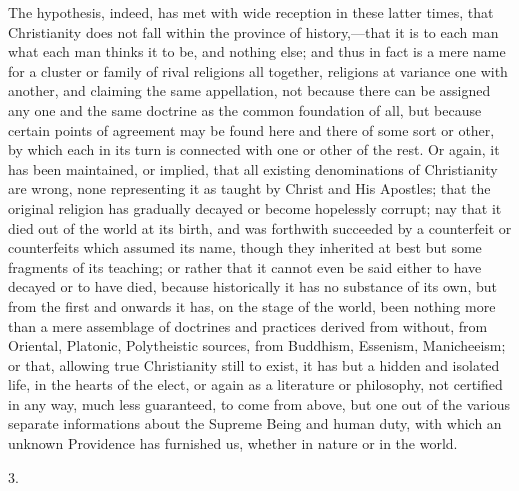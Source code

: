 The hypothesis, indeed, has met with wide reception in
these latter times, that Christianity does not fall
within the province of history,—that it is to each
man what each man thinks it to be, and nothing else; and
thus in fact is a mere name for a cluster or family of
rival religions all together, religions at variance one
with another, and claiming the same appellation, not
because there can be assigned any one and the same
doctrine as the common foundation of all, but because
certain points of agreement may be found here and there
of some sort or other, by which each in its turn is
connected with one or other of the rest. Or again, it has
been maintained, or implied, that all existing
denominations of Christianity are wrong, none
representing it as taught by Christ and His Apostles;
that the original religion has gradually decayed or
become hopelessly corrupt; nay that it died out of the
world at its birth, and was forthwith succeeded by a
counterfeit or counterfeits which assumed its name,
though they inherited at best but some fragments of its
teaching; or rather that it cannot even be said either to
have decayed or to have died, because historically it has
no substance of its own, but from the first and onwards
it has, on the stage of the world, been nothing more than
a mere assemblage of doctrines and practices derived from
without, from Oriental, Platonic, Polytheistic sources,
from Buddhism, Essenism, Manicheeism; or that, allowing
true Christianity still to exist, it has but a hidden and
isolated life, in the hearts of the elect, or again as a
literature or philosophy, not certified in any way, much
less guaranteed, to come from above, but one out of the
various separate informations about the Supreme Being and
human duty, with which an unknown Providence has
furnished us, whether in nature or in the world.

3.

